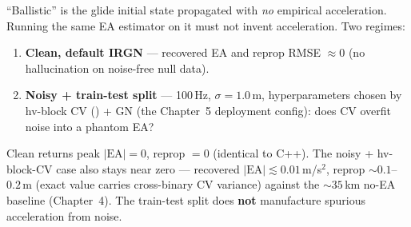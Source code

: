 ``Ballistic'' is the glide initial state propagated with \emph{no}
empirical acceleration. Running the same EA estimator on it must not invent
acceleration. Two regimes:

\begin{enumerate}
\item \textbf{Clean, default IRGN} --- recovered EA and reprop RMSE
${\approx}0$ (no hallucination on noise-free null data).
\item \textbf{Noisy + train-test split} --- 100\,Hz, $\sigma=1.0\,$m,
hyperparameters chosen by hv-block CV () + GN (the
Chapter~5 deployment config): does CV overfit noise into a phantom EA?
\end{enumerate}


Clean returns peak $|\mathrm{EA}|=0$, reprop $=0$ (identical to C++). The
noisy + hv-block-CV case also stays near zero --- recovered
$|\mathrm{EA}|\lesssim0.01\,$m/s$^2$, reprop ${\sim}0.1$--$0.2\,$m (exact
value carries cross-binary CV variance) against the ${\sim}35\,$km
no-EA baseline (Chapter~4). The train-test split does \textbf{not}
manufacture spurious acceleration from noise.
